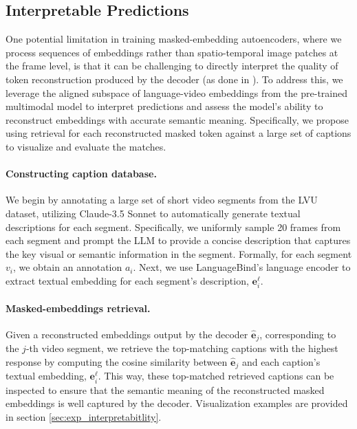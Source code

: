 \subsection{Interpretable Predictions} \label{subsec:interpretability}

One potential limitation in training masked-embedding autoencoders, where we process sequences of embeddings rather than spatio-temporal image patches at the frame level, is that it can be challenging to directly interpret the quality of token reconstruction produced by the decoder (\eg as done in \cite{he2022masked}). To address this, we leverage the aligned subspace of language-video embeddings from the pre-trained multimodal model to interpret predictions and assess the model's ability to reconstruct embeddings with accurate semantic meaning.
Specifically, we propose using retrieval for each reconstructed masked token against a large set of captions to visualize and evaluate the matches.
\vspace{-5mm}
\paragraph{Constructing caption database.} We begin by annotating a large set of short video segments from the LVU dataset, utilizing Claude-3.5 Sonnet \cite{anthropic2024claude35sonnet} to automatically generate textual descriptions for each segment. Specifically, we uniformly sample 20 frames from each segment and prompt the LLM to provide a concise description that captures the key visual or semantic information in the segment. Formally, for each segment $v_i$, we obtain an annotation $a_i$.
Next, we use LanguageBind's language encoder to extract textual embedding for each segment's description, $\mathbf{e}_i^{\ell}$.
\vspace{-5mm}
\paragraph{Masked-embeddings retrieval.} Given a reconstructed embeddings output by the decoder $\hat{\mathbf{e}}_j$, corresponding to the $j$-th video segment, we retrieve the top-matching captions with the highest response by computing the cosine similarity between $\hat{\mathbf{e}}_j$ and each caption's textual embedding,
$\mathbf{e}_i^{\ell}$. This way, these top-matched retrieved captions can be inspected to ensure that the semantic meaning of the reconstructed masked embeddings is well captured by the decoder. Visualization examples are provided in section \ref{sec:exp_interpretabitlity}.
